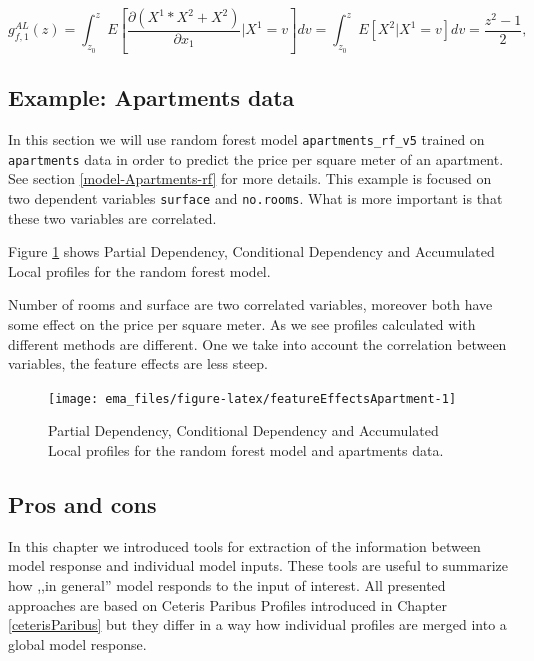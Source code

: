 \documentclass[12pt,]{krantz}
\begin{document}
\[
g^{AL}_{f,1}(z) = \int_{z_0}^z E\left[\frac{\partial (X^1*X^2 + X^2)}{\partial x_1}|X^1 = v\right] dv  = \int_{z_0}^z E\left[X^2|X^1 = v\right] dv  = \frac{z^2 -1 }{2},
\]

\hypertarget{CDPExample}{%
\subsection{Example: Apartments data}\label{CDPExample}}

In this section we will use random forest model \texttt{apartments\_rf\_v5} trained on \texttt{apartments} data in order to predict the price per square meter of an apartment. See section \ref{model-Apartments-rf} for more details.
This example is focused on two dependent variables \texttt{surface} and \texttt{no.rooms}. What is more important is that these two variables are correlated.

Figure \ref{fig:featureEffectsApartment} shows Partial Dependency, Conditional Dependency and Accumulated Local profiles for the random forest model.

Number of rooms and surface are two correlated variables, moreover both have some effect on the price per square meter. As we see profiles calculated with different methods are different. One we take into account the correlation between variables, the feature effects are less steep.

\begin{figure}

{\centering \texttt{[image: ema\_files/figure-latex/featureEffectsApartment-1]} 

}

\caption{Partial Dependency, Conditional Dependency and Accumulated Local profiles for the random forest model and apartments data.}\label{fig:featureEffectsApartment}
\end{figure}

\hypertarget{ALPProsCons}{%
\subsection{Pros and cons}\label{ALPProsCons}}

In this chapter we introduced tools for extraction of the information between model response and individual model inputs. These tools are useful to summarize how ,,in general'' model responds to the input of interest. All presented approaches are based on Ceteris Paribus Profiles introduced in Chapter \ref{ceterisParibus} but they differ in a way how individual profiles are merged into a global model response.
\end{document}
